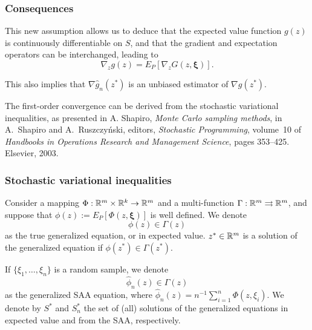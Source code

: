 \documentclass{beamer}
\def\bxi{\boldsymbol\xi}
\begin{document}
\begin{frame}
\frametitle{Consequences}

This new assumption allows us to deduce that the expected value function $g(z)$ is continuously differentiable on $S$, and that the gradient and expectation operators can be interchanged, leading to
\[
\nabla_z g(z) = E_P\left[ \nabla_z G(z, \bxi) \right].
\]

\mbox{}

This also implies that $\nabla \hat{g}_n(z^*)$ is an unbiased estimator of $\nabla g( z^*)$.

\mbox{}

The {\blue first-order convergence} can be derived from the stochastic variational inequalities, as presented in A. Shapiro, {\sl Monte Carlo sampling methods},
in A.~Shapiro and A.~Ruszczy\'nski, editors, {\sl Stochastic Programming}, volume~10 of {\sl Handbooks in Operations Research and Management Science}, pages 353--425. Elsevier, 2003.

\end{frame}

\begin{frame}
\frametitle{Stochastic variational inequalities}

Consider a mapping $\Phi: \mathbb{R}^m \times \mathbb{R}^k \rightarrow \mathbb{R}^m$ and a multi-function $\Gamma: \mathbb{R}^m \rightrightarrows  \mathbb{R}^m$, and suppose that $\phi(z) := E_{P}[\Phi(z, \bxi)]$ is well defined.
We denote
\[
\phi(z) \in \Gamma(z)
\]
as the true {\blue generalized equation}, or in expected value.
$z^* \in \mathbb{R}^m$ is a solution of the generalized equation if $\phi(z^*) \in \Gamma(z^*)$.

\mbox{}

If $\lbrace \xi_1,\ldots,\xi_n \rbrace$ is a random sample, we denote
\[
\hat{\phi}_n(z) \in \Gamma(z)
\]
as the generalized SAA equation, where $\hat{\phi}_n(z) = n^{-1}\sum_{i=1}^n \Phi(z,\xi_i)$.
We denote by $S^*$ and $S^*_n$ the set of (all) solutions of the generalized equations in expected value and from the SAA, respectively.

\end{frame}
\end{document}

